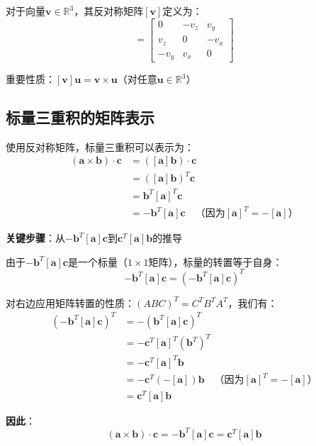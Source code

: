 \documentclass[12pt,a4paper]{article}
\begin{document}
对于向量$\bm{v} \in \mathbb{R}^3$，其反对称矩阵$[\bm{v}]$定义为：
\begin{equation}
[\bm{v}] = \begin{bmatrix}
0 & -v_z & v_y \\
v_z & 0 & -v_x \\
-v_y & v_x & 0
\end{bmatrix}
\end{equation}

重要性质：$[\bm{v}] \bm{u} = \bm{v} \times \bm{u}$（对任意$\bm{u} \in \mathbb{R}^3$）

\subsection{标量三重积的矩阵表示}

使用反对称矩阵，标量三重积可以表示为：
\begin{align}
(\bm{a} \times \bm{b}) \cdot \bm{c} &= ([\bm{a}] \bm{b}) \cdot \bm{c} \\
&= ([\bm{a}] \bm{b})^T \bm{c} \\
&= \bm{b}^T [\bm{a}]^T \bm{c} \\
&= -\bm{b}^T [\bm{a}] \bm{c} \quad \text{（因为$[\bm{a}]^T = -[\bm{a}]$）}
\label{eq:intermediate_form}
\end{align}

\textbf{关键步骤}：从$-\bm{b}^T [\bm{a}] \bm{c}$到$\bm{c}^T [\bm{a}] \bm{b}$的推导

由于$-\bm{b}^T [\bm{a}] \bm{c}$是一个标量（$1 \times 1$矩阵），标量的转置等于自身：
\begin{equation}
-\bm{b}^T [\bm{a}] \bm{c} = (-\bm{b}^T [\bm{a}] \bm{c})^T
\end{equation}

对右边应用矩阵转置的性质：$(ABC)^T = C^T B^T A^T$，我们有：
\begin{align}
(-\bm{b}^T [\bm{a}] \bm{c})^T &= -(\bm{b}^T [\bm{a}] \bm{c})^T \\
&= -\bm{c}^T [\bm{a}]^T (\bm{b}^T)^T \\
&= -\bm{c}^T [\bm{a}]^T \bm{b} \\
&= -\bm{c}^T (-[\bm{a}]) \bm{b} \quad \text{（因为$[\bm{a}]^T = -[\bm{a}]$）} \\
&= \bm{c}^T [\bm{a}] \bm{b}
\end{align}

\textbf{因此}：
\begin{equation}
(\bm{a} \times \bm{b}) \cdot \bm{c} = -\bm{b}^T [\bm{a}] \bm{c} = \bm{c}^T [\bm{a}] \bm{b}
\end{equation}
\end{document}
